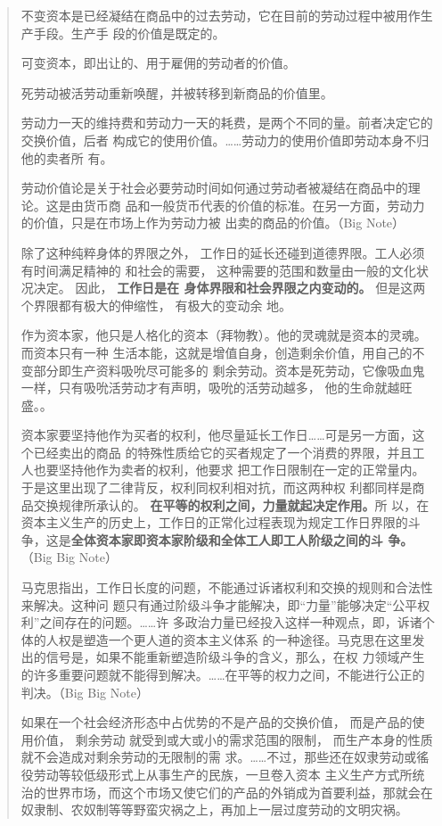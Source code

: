 \begin{quotation}
不变资本是已经凝结在商品中的过去劳动，它在目前的劳动过程中被用作生产手段。生产手
段的价值是既定的。

可变资本，即出让的、用于雇佣的劳动者的价值。

死劳动被活劳动重新唤醒，并被转移到新商品的价值里。


劳动力一天的维持费和劳动力一天的耗费，是两个不同的量。前者决定它的交换价值，后者
构成它的使用价值。……劳动力的使用价值即劳动本身不归他的卖者所
有。

劳动价值论是关于社会必要劳动时间如何通过劳动者被凝结在商品中的理论。这是由货币商
品和一般货币代表的价值的标准。在另一方面，劳动力的价值，只是在市场上作为劳动力被
出卖的商品的价值。（Big Note） 

除了这种纯粹身体的界限之外， 工作日的延长还碰到道德界限。工人必须有时间满足精神的
和社会的需要， 这种需要的范围和数量由一般的文化状况决定。 因此， \textbf{工作日是在
  身体界限和社会界限之内变动的。} 但是这两个界限都有极大的伸缩性， 有极大的变动余
地。



作为资本家，他只是人格化的资本（拜物教）。他的灵魂就是资本的灵魂。而资本只有一种
生活本能，这就是增值自身，创造剩余价值，用自己的不变部分即生产资料吸吮尽可能多的
剩余劳动。资本是死劳动，它像吸血鬼一样，只有吸吮活劳动才有声明，吸吮的活劳动越多，
他的生命就越旺盛。。

资本家要坚持他作为买者的权利，他尽量延长工作日……可是另一方面，这个已经卖出的商品
的特殊性质给它的买者规定了一个消费的界限，并且工人也要坚持他作为卖者的权利，他要求
把工作日限制在一定的正常量内。于是这里出现了二律背反，权利同权利相对抗，而这两种权
利都同样是商品交换规律所承认的。 \textbf{在平等的权利之间，力量就起决定作用。}所
以，在资本主义生产的历史上，工作日的正常化过程表现为规定工作日界限的斗
争，这是\textbf{全体资本家即资本家阶级和全体工人即工人阶级之间的斗
  争。}（Big Big Note）

马克思指出，工作日长度的问题，不能通过诉诸权利和交换的规则和合法性来解决。这种问
题只有通过阶级斗争才能解决，即“力量”能够决定“公平权利”之间存在的问题。……许
多政治力量已经投入这样一种观点，即，诉诸个体的人权是塑造一个更人道的资本主义体系
的一种途径。马克思在这里发出的信号是，如果不能重新塑造阶级斗争的含义，那么，在权
力领域产生的许多重要问题就不能得到解决。……在平等的权力之间，不能进行公正的判决。（Big Big Note） 

如果在一个社会经济形态中占优势的不是产品的交换价值， 而是产品的使用价值， 剩余劳动
就受到或大或小的需求范围的限制， 而生产本身的性质就不会造成对剩余劳动的无限制的需
求。……不过，那些还在奴隶劳动或徭役劳动等较低级形式上从事生产的民族，一旦卷入资本
主义生产方式所统治的世界市场，而这个市场又使它们的产品的外销成为首要利益，那就会在
奴隶制、农奴制等等野蛮灾祸之上，再加上一层过度劳动的文明灾祸。 


\end{quotation}
